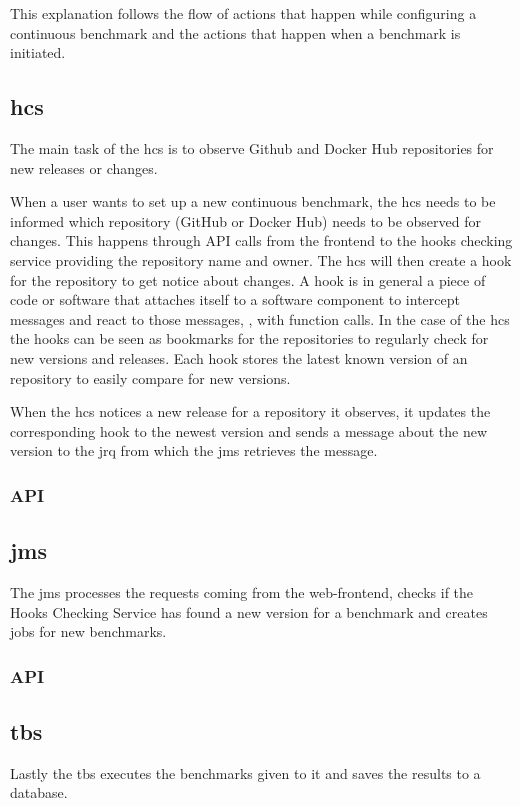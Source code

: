 This explanation follows the flow of actions that happen while configuring a continuous benchmark and the actions that happen when a benchmark is initiated.


\subsection{\acl{hcs}}
\label{sec:hooks_checking_service}
The main task of the \ac{hcs} is to observe Github and Docker Hub repositories for new releases or changes.

When a user wants to set up a new continuous benchmark, the \ac{hcs} needs to be informed which repository (GitHub or Docker Hub) needs to be observed for changes.
This happens through API calls from the frontend to the hooks checking service providing the repository name and owner.
The \ac{hcs} will then create a hook for the repository to get notice about changes.
A hook is in general a piece of code or software that attaches itself to a software component to intercept messages and react to those messages, \eg, with function calls.
In the case of the \ac{hcs} the hooks can be seen as bookmarks for the repositories to regularly check for new versions and releases.
Each hook stores the latest known version of an repository to easily compare for new versions.

When the \ac{hcs} notices a new release for a repository it observes, it updates the corresponding hook to the newest version and sends a message about the new version to the \acl{jrq} from which the \acl{jms} retrieves the message.

\subsubsection{API}
\label{sec:hooks_api}


\subsection{\acl{jms}}
\label{sec:jobs_managing_service}
The \acf{jms} processes the requests coming from the web-frontend, checks if the Hooks Checking Service has found a new version for a benchmark and creates jobs for new benchmarks.

\subsubsection{API}
\label{sec:jobs_api}


\subsection{\acl{tbs}}
\label{sec:ts_benchmarking_service}
Lastly the \ac{tbs} executes the benchmarks given to it and saves the results to a database.

